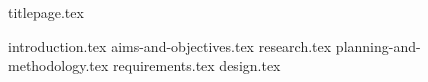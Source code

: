 \documentclass{article}
\begin{document}
	{titlepage.tex}
	\tableofcontents
	\thispagestyle{empty}
	\cleardoublepage
	\setcounter{page}{1}
	
	{introduction.tex}
	{aims-and-objectives.tex}
	{research.tex}
	{planning-and-methodology.tex}
	{requirements.tex}
	{design.tex}
\end{document}
